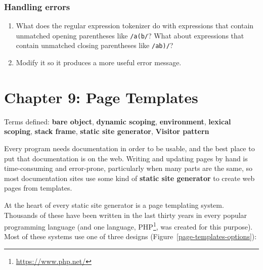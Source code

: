 \documentclass[krantzl]{krantz}
\newcommand{\figref}[1]{Figure~\ref{#1}}
\newcommand{\glossref}[1]{\textbf{#1}}
\newcommand{\hreffoot}[2]{{#1}\footnote{\href{#2}{#2}}}
\begin{document}
\subsection*{Handling errors}

\begin{enumerate}

\item 

What does the regular expression tokenizer do
    with expressions that contain unmatched opening parentheses like \texttt{/a(b/}?
    What about expressions that contain unmatched closing parentheses like \texttt{/ab)/}?



\item 

Modify it so it produces a more useful error message.



\end{enumerate}

\chapter{Chapter 9: Page Templates}\label{page-templates}


\noindent 
    Terms defined:
    \glossref{bare object}, \glossref{dynamic scoping}, \glossref{environment}, \glossref{lexical scoping}, \glossref{stack frame}, \glossref{static site generator}, \glossref{Visitor pattern}



Every program needs documentation in order to be usable,
and the best place to put that documentation is on the web.
Writing and updating pages by hand is time-consuming and error-prone,
particularly when many parts are the same,
so most documentation sites use some kind of
\glossref{static site generator}
to create web pages from templates.


At the heart of every static site generator is a page templating system.
Thousands of these have been written in the last thirty years
in every popular programming language
(and one language, \hreffoot{PHP}{https://www.php.net/}, was created for this purpose).
Most of these systems use one of three designs
(\figref{page-templates-options}):
\end{document}
